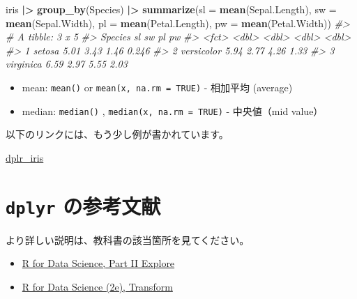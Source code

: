 \documentclass[
  xelatex, ja=standard]{bxjsbook}
\newenvironment{Shaded}{\begin{snugshade}}{\end{snugshade}}
\newcommand{\AttributeTok}[1]{\textcolor[rgb]{0.13,0.29,0.53}{#1}}
\newcommand{\CommentTok}[1]{\textcolor[rgb]{0.56,0.35,0.01}{\textit{#1}}}
\newcommand{\FunctionTok}[1]{\textcolor[rgb]{0.13,0.29,0.53}{\textbf{#1}}}
\newcommand{\NormalTok}[1]{#1}
\newcommand{\SpecialCharTok}[1]{\textcolor[rgb]{0.81,0.36,0.00}{\textbf{#1}}}
\providecommand{\tightlist}{%
  \setlength{\itemsep}{0pt}\setlength{\parskip}{0pt}}
\theoremstyle{definition}
\theoremstyle{definition}
\theoremstyle{definition}
\theoremstyle{definition}
\theoremstyle{remark}
\begin{document}
\begin{Shaded}
\begin{Highlighting}[]
\NormalTok{iris }\SpecialCharTok{|\textgreater{}} 
  \FunctionTok{group\_by}\NormalTok{(Species) }\SpecialCharTok{|\textgreater{}}
  \FunctionTok{summarize}\NormalTok{(}\AttributeTok{sl =} \FunctionTok{mean}\NormalTok{(Sepal.Length), }\AttributeTok{sw =} \FunctionTok{mean}\NormalTok{(Sepal.Width), }
  \AttributeTok{pl =} \FunctionTok{mean}\NormalTok{(Petal.Length), }\AttributeTok{pw =} \FunctionTok{mean}\NormalTok{(Petal.Width))}
\CommentTok{\#\textgreater{} \# A tibble: 3 x 5}
\CommentTok{\#\textgreater{}   Species       sl    sw    pl    pw}
\CommentTok{\#\textgreater{}   \textless{}fct\textgreater{}      \textless{}dbl\textgreater{} \textless{}dbl\textgreater{} \textless{}dbl\textgreater{} \textless{}dbl\textgreater{}}
\CommentTok{\#\textgreater{} 1 setosa      5.01  3.43  1.46 0.246}
\CommentTok{\#\textgreater{} 2 versicolor  5.94  2.77  4.26 1.33 }
\CommentTok{\#\textgreater{} 3 virginica   6.59  2.97  5.55 2.03}
\end{Highlighting}
\end{Shaded}

\begin{itemize}
\tightlist
\item
  mean: \texttt{mean()} or \texttt{mean(x,\ na.rm\ =\ TRUE)} - 相加平均 (average)
\item
  median: \texttt{median()} , \texttt{median(x,\ na.rm\ =\ TRUE)} - 中央値（mid value）
\end{itemize}

以下のリンクには、もう少し例が書かれています。

\href{https://icu-hsuzuki.github.io/da4r2022_note/dplyr-iris.nb.html}{dplr\_iris}

\hypertarget{dplyr-ux306eux53c2ux8003ux6587ux732e}{%
\section{\texorpdfstring{\texttt{dplyr} の参考文献}{dplyr の参考文献}}\label{dplyr-ux306eux53c2ux8003ux6587ux732e}}

より詳しい説明は、教科書の該当箇所を見てください。

\begin{itemize}
\tightlist
\item
  \href{https://r4ds.had.co.nz/wrangle-intro.html\#wrangle-intro}{R for Data Science, Part II Explore}
\item
  \href{https://r4ds.hadley.nz/transform}{R for Data Science (2e), Transform}
\end{itemize}
\end{document}
